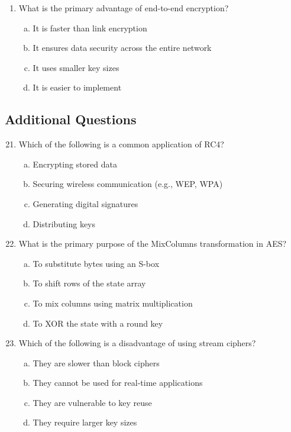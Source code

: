 \documentclass[12pt]{article}
\begin{document}
\begin{enumerate}
    \item What is the primary advantage of end-to-end encryption?
    \begin{enumerate}[(a)]
        \item It is faster than link encryption
        \item It ensures data security across the entire network
        \item It uses smaller key sizes
        \item It is easier to implement
    \end{enumerate}
\end{enumerate}

\subsection*{Additional Questions}

\begin{enumerate}
    \setcounter{enumi}{20}
    \item Which of the following is a common application of RC4?
    \begin{enumerate}[(a)]
        \item Encrypting stored data
        \item Securing wireless communication (e.g., WEP, WPA)
        \item Generating digital signatures
        \item Distributing keys
    \end{enumerate}

    \item What is the primary purpose of the MixColumns transformation in AES?
    \begin{enumerate}[(a)]
        \item To substitute bytes using an S-box
        \item To shift rows of the state array
        \item To mix columns using matrix multiplication
        \item To XOR the state with a round key
    \end{enumerate}

    \item Which of the following is a disadvantage of using stream ciphers?
    \begin{enumerate}[(a)]
        \item They are slower than block ciphers
        \item They cannot be used for real-time applications
        \item They are vulnerable to key reuse
        \item They require larger key sizes
    \end{enumerate}

    
\end{enumerate}
\newpage
\end{document}
